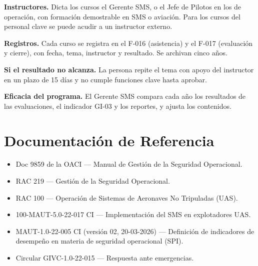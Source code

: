 \textbf{Instructores.} Dicta los cursos el Gerente SMS, o el Jefe de Pilotos en los de operación, con formación demostrable en SMS o aviación. Para los cursos del personal clave se puede acudir a un instructor externo.

\textbf{Registros.} Cada curso se registra en el F-016 (asistencia) y el F-017 (evaluación y cierre), con fecha, tema, instructor y resultado. Se archivan cinco años.

\textbf{Si el resultado no alcanza.} La persona repite el tema con apoyo del instructor en un plazo de 15 días y no cumple funciones clave hasta aprobar.

\textbf{Eficacia del programa.} El Gerente SMS compara cada año los resultados de las evaluaciones, el indicador GI-03 y los reportes, y ajusta los contenidos.

\clearpage
\section*{Documentación de Referencia}
\begin{itemize}
    \item Doc 9859 de la OACI --- Manual de Gestión de la Seguridad Operacional.
    \item RAC 219 --- Gestión de la Seguridad Operacional.
    \item RAC 100 --- Operación de Sistemas de Aeronaves No Tripuladas (UAS).
    \item 100-MAUT-5.0-22-017 CI --- Implementación del SMS en explotadores UAS.
    \item MAUT-1.0-22-005 CI (versión 02, 20-03-2026) --- Definición de indicadores de desempeño en materia de seguridad operacional (SPI).
    \item Circular GIVC-1.0-22-015 --- Respuesta ante emergencias.
\end{itemize}
\label{fin_anexos}
